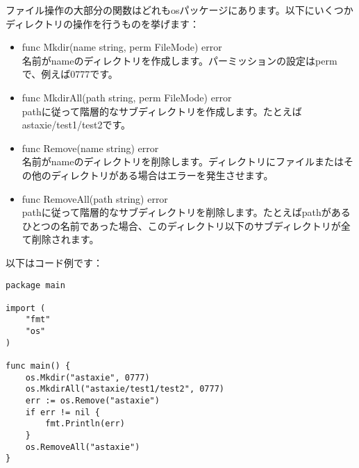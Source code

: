 ファイル操作の大部分の関数はどれもosパッケージにあります。以下にいくつかディレクトリの操作を行うものを挙げます：

\begin{itemize}
  \item func Mkdir(name string, perm FileMode) error\\ 名前がnameのディレクトリを作成します。パーミッションの設定はpermで、例えば0777です。
  \item func MkdirAll(path string, perm FileMode) error\\ pathに従って階層的なサブディレクトリを作成します。たとえばastaxie/test1/test2です。
  \item func Remove(name string) error\\ 名前がnameのディレクトリを削除します。ディレクトリにファイルまたはその他のディレクトリがある場合はエラーを発生させます。
  \item func RemoveAll(path string) error\\ pathに従って階層的なサブディレクトリを削除します。たとえばpathがあるひとつの名前であった場合、このディレクトリ以下のサブディレクトリが全て削除されます。
\end{itemize}

以下はコード例です：

\begin{lstlisting}[numbers=none]
package main

import (
    "fmt"
    "os"
)

func main() {
    os.Mkdir("astaxie", 0777)
    os.MkdirAll("astaxie/test1/test2", 0777)
    err := os.Remove("astaxie")
    if err != nil {
        fmt.Println(err)
    }
    os.RemoveAll("astaxie")
}
\end{lstlisting}

